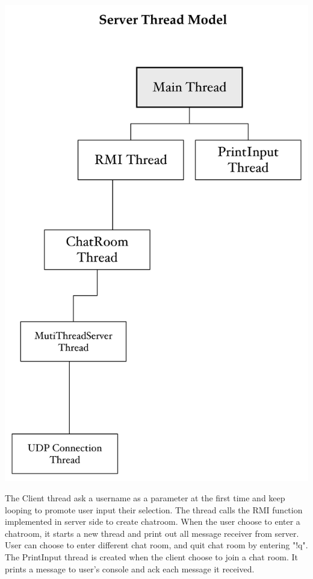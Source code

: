 \documentclass{article}
\begin{document}
\includegraphics[scale=0.05]{Server}

\clearpage

The Client thread ask a username as a parameter at the first time and keep looping to promote user input their selection. The thread calls the RMI function implemented in server side to create chatroom. When the user choose to enter a chatroom, it starts a new thread and print out all message receiver from server. User can choose to enter different chat room, and quit chat room by entering "!q".\\

The PrintInput thread is created when the client choose to join a chat room. It prints a message to user's console and ack each message it received.\\
\end{document}
